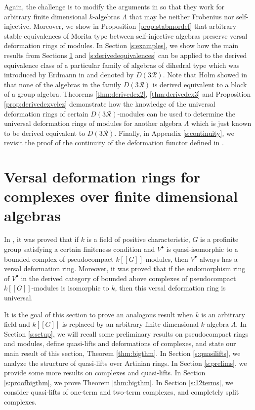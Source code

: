 \documentclass{amsart}
\theoremstyle{plain}
\theoremstyle{definition}
\theoremstyle{remark}
\begin{document}
Again, the challenge is to modify the arguments in \cite{derivedeq} so that they work for arbitrary finite dimensional $k$-algebras
$\Lambda$ that may be  neither Frobenius nor self-injective.
Moreover, we show in Proposition \ref{prop:stabmordef} that arbitrary stable equivalences of Morita type between
{self-injective} algebras preserve versal deformation rings of modules. In Section \ref{s:examples}, we show how the main results
from Sections \ref{s:udr} and \ref{s:derivedequivalences} can be applied to the derived equivalence
class of a particular family of algebras of dihedral type which was introduced by Erdmann in \cite{erd} and denoted by $D(3\mathcal{R})$. Note
that Holm showed in \cite[Sect. 3.2]{holm} that none of the algebras in the family $D(3\mathcal{R})$ is derived equivalent to a block of
a group algebra. Theorems \ref{thm:derivedex2},
\ref{thm:derivedex3} and Proposition \ref{prop:derivedexvelez} demonstrate how the knowledge of the universal
deformation rings of certain $D(3\mathcal{R})$-modules can be used to determine the universal deformation
rings of modules for another algebra $\Lambda$ which is just known to be derived equivalent to $D(3\mathcal{R})$.
Finally, in Appendix \ref{s:continuity}, we revisit the proof of the continuity of the deformation functor defined in 
\cite{bcderived}.
 

\section{Versal deformation rings for complexes over finite dimensional algebras}
\label{s:udr}
\setcounter{equation}{0}

In \cite{comptes,bcderived}, it was proved that if $k$ is a field of positive characteristic,
$G$ is a profinite group satisfying a certain finiteness
condition and $V^\bullet$ is quasi-isomorphic to a bounded complex of pseudocompact 
$k[[G]]$-modules, then $V^\bullet$ always has a versal deformation ring.
Moreover, it was proved that if the endomorphism ring of $V^\bullet$ 
in the derived category of bounded above complexes of pseudocompact $k[[G]]$-modules 
is isomorphic to $k$, then this versal deformation ring is universal. 

It is the goal of this section to prove an analogous result when $k$ is  an arbitrary field
and $k[[G]]$ is replaced by an arbitrary finite dimensional $k$-algebra $\Lambda$.
In Section \ref{s:setup}, we will recall some preliminary results on pseudocompact rings and modules,
define quasi-lifts and deformations of complexes, and state our main result of this section, Theorem \ref{thm:bigthm}.
In Section \ref{s:quasilifts}, we analyze the structure of quasi-lifts over Artinian rings. In Section \ref{s:prelims},
we provide some more results on complexes and quasi-lifts. In Section
\ref{s:proofbigthm}, we prove Theorem \ref{thm:bigthm}. In Section \ref{s:12terms}, 
we consider quasi-lifts of one-term and two-term complexes, and completely split complexes.
\end{document}
